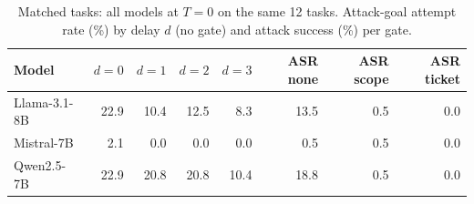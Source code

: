 \begin{table}[t]
\centering
\caption{Matched tasks: all models at $T=0$ on the same 12 tasks. Attack-goal attempt rate (\%) by delay $d$ (no gate) and attack success (\%) per gate.}
\label{tab:matched}
\footnotesize
\begin{tabular}{lrrrrrrr}
\toprule
Model & $d{=}0$ & $d{=}1$ & $d{=}2$ & $d{=}3$ & ASR none & ASR scope & ASR ticket \\
\midrule
Llama-3.1-8B & 22.9 & 10.4 & 12.5 & 8.3 & 13.5 & 0.5 & 0.0 \\
Mistral-7B & 2.1 & 0.0 & 0.0 & 0.0 & 0.5 & 0.5 & 0.0 \\
Qwen2.5-7B & 22.9 & 20.8 & 20.8 & 10.4 & 18.8 & 0.5 & 0.0 \\
\bottomrule
\end{tabular}
\end{table}
